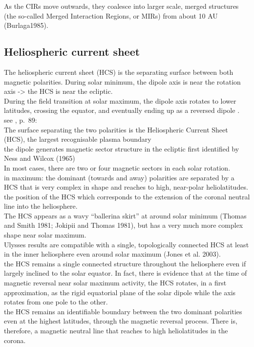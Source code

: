 As the CIRs move outwards, they coalesce into larger scale, merged structures (the so-called Merged Interaction Regions, or MIRs) from about 10 AU (Burlaga1985).\\



\subsection{Heliospheric current sheet}

The heliospheric current sheet (HCS) is the separating surface between both magnetic polarities. During solar minimum, the dipole axis is near the rotation axis -> the HCS is near the ecliptic.\\
During the field transition at solar maximum, the dipole axis rotates to lower latitudes, crossing the equator, and eventually ending up as a reversed dipole \citep{Jones2003}.\\


see \citet{Balogh2009}, p.~89:\\
The surface separating the two polarities is the Heliospheric Current Sheet (HCS), the largest recognisable plasma boundary\\

the dipole generates magnetic sector structure in the ecliptic first identified by Ness and Wilcox (1965)\\
In most cases, there are two or four magnetic sectors in each solar rotation.\\

in maximum: the dominant (towards and away) polarities are separated by a HCS that is very complex in shape and reaches to high, near-polar heliolatitudes.\\
the position of the HCS which corresponds to the extension of the coronal neutral line into the heliosphere.\\
The HCS appears as a wavy “ballerina skirt” at around solar minimum (Thomas and Smith 1981; Jokipii and Thomas 1981), but has a very much more complex shape near solar maximum.\\
Ulysses results are compatible with a single, topologically connected HCS at least in the inner heliosphere even around solar maximum (Jones et al. 2003).\\
the HCS remains a single connected structure throughout the heliosphere even if largely inclined to the solar equator. In fact, there is evidence that at the time of magnetic reversal near solar maximum activity, the HCS rotates, in a first approximation, as the rigid equatorial plane of the solar dipole while the axis rotates from one pole to the other.\\
the HCS remains an identifiable boundary between the two dominant polarities even at the highest latitudes, through the magnetic reversal process. There is, therefore, a magnetic neutral line that reaches to high heliolatitudes in the corona.\\


